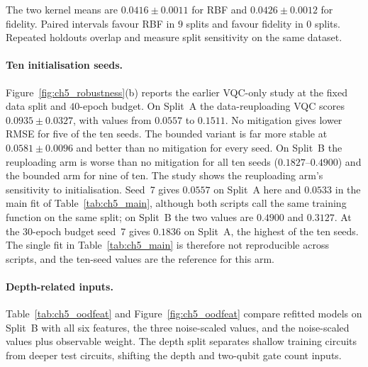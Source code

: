 \documentclass[Thesis.tex]{subfiles}
\begin{document}
The two kernel means are $0.0416\pm0.0011$ for RBF and
$0.0426\pm0.0012$ for fidelity. Paired intervals favour RBF in
$9$ splits and favour fidelity in $0$ splits. Repeated
holdouts overlap and measure split sensitivity on the same dataset.

\paragraph{Ten initialisation seeds.} Figure~\ref{fig:ch5_robustness}(b) reports
the earlier VQC-only study at the fixed data split and $40$-epoch budget.
On Split~A the data-reuploading VQC scores
$0.0935 \pm 0.0327$, with values from $0.0557$ to $0.1511$. No mitigation gives
lower RMSE for five of the ten seeds. The
bounded variant is far more stable at $0.0581 \pm 0.0096$ and better than no
mitigation for every seed. On Split~B the reuploading arm is worse than no
mitigation for all ten seeds ($0.1827$--$0.4900$) and the bounded arm for nine of
ten. The study shows the reuploading arm's sensitivity to initialisation.
Seed~7 gives $0.0557$ on Split~A here and $0.0533$ in the main fit of
Table~\ref{tab:ch5_main}, although both scripts call the same training function on
the same split; on Split~B the two values are $0.4900$ and $0.3127$. At the 30-epoch
budget seed~7 gives $0.1836$ on Split~A, the highest of the ten seeds. The single fit
in Table~\ref{tab:ch5_main} is therefore not reproducible across scripts, and the
ten-seed values are the reference for this arm.

\paragraph{Depth-related inputs.} Table~\ref{tab:ch5_oodfeat} and
Figure~\ref{fig:ch5_oodfeat} compare refitted models on Split~B with all six
features, the three noise-scaled values, and the noise-scaled values plus
observable weight. The depth split separates shallow training circuits from
deeper test circuits, shifting the depth and two-qubit gate count inputs.
\end{document}

